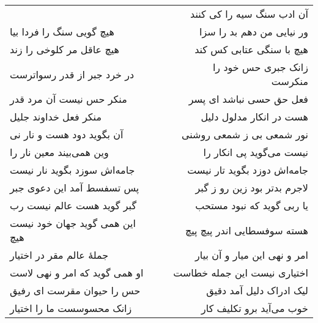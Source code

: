 \begin{center}
\begin{longtable}{l p{0.5cm} r}
&&
آن ادب سنگ سیه را کی کنند
\\
هیچ گویی سنگ را فردا بیا
&&
ور نیایی من دهم بد را سزا
\\
هیچ عاقل مر کلوخی را زند
&&
هیچ با سنگی عتابی کس کند
\\
در خرد جبر از قدر رسواترست
&&
زانک جبری حس خود را منکرست
\\
منکر حس نیست آن مرد قدر
&&
فعل حق حسی نباشد ای پسر
\\
منکر فعل خداوند جلیل
&&
هست در انکار مدلول دلیل
\\
آن بگوید دود هست و نار نی
&&
نور شمعی بی ز شمعی روشنی
\\
وین همی‌بیند معین نار را
&&
نیست می‌گوید پی انکار را
\\
جامه‌اش سوزد بگوید نار نیست
&&
جامه‌اش دوزد بگوید تار نیست
\\
پس تسفسط آمد این دعوی جبر
&&
لاجرم بدتر بود زین رو ز گبر
\\
گبر گوید هست عالم نیست رب
&&
یا ربی گوید که نبود مستحب
\\
این همی گوید جهان خود نیست هیچ
&&
هسته سوفسطایی اندر پیچ پیچ
\\
جملهٔ عالم مقر در اختیار
&&
امر و نهی این میار و آن بیار
\\
او همی گوید که امر و نهی لاست
&&
اختیاری نیست این جمله خطاست
\\
حس را حیوان مقرست ای رفیق
&&
لیک ادراک دلیل آمد دقیق
\\
زانک محسوسست ما را اختیار
&&
خوب می‌آید برو تکلیف کار
\\
\end{longtable}
\end{center}
